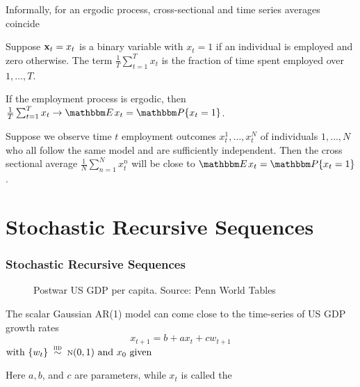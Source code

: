 \begin{frame}
    
    \vspace{2em}
    Informally, for an ergodic process, cross-sectional and time series averages coincide
    
    \vspace{1em}
    \Eg
    Suppose ${\mathbf x}_t = x_t$ is a
    binary variable with $x_t = 1$ if an individual is employed and zero otherwise. 
    The term $\frac{1}{T} \sum_{t=1}^T x_t$ is the fraction
    of time spent employed over $1, \ldots, T$. 
    
    If the employment process is ergodic, then $\frac{1}{T}\sum_{t=1}^{T}x_{t}\rightarrow  \EE x_t = \PP\{x_t = 1\}$.
    
    Suppose we observe time $t$ 
    employment outcomes $x_t^1, \ldots, x_t^N$ of individuals $1, \ldots, N$ 
    who all follow the same model and are sufficiently 
    independent. Then the cross sectional average 
    $\frac{1}{N} \sum_{n=1}^N x_t^n$ will  be close to $\EE x_t = \PP\{x_t = 1\}$.
    

\end{frame}

\section{Stochastic Recursive Sequences} 

    \begin{frame}\frametitle{Stochastic Recursive Sequences}
    
        \vspace{2em}
        \begin{figure}
        \centering
        \caption{\label{f:gdp} Postwar US GDP per capita. Source: Penn World Tables}
        
    \end{figure}

\end{frame}

\begin{frame}

    \vspace{2em}
    The scalar Gaussian AR(1)  model can come close to the time-series of US GDP growth rates 
    \begin{equation}
    \label{eq:sgar1}
    x_{t+1} = b + a x_t + c w_{t+1}
    \end{equation}
    $\text{with } \{ w_t \} \stackrel {\textrm{ {\sc iid }}} {\sim} \textrm{\sc n}(0,1)
    \text{ and } x_0 \text{ given}$
    
    \vspace{1em}
    Here $a, b$, and $c$ are parameters, while $x_t$
    is called the 

\end{frame}


